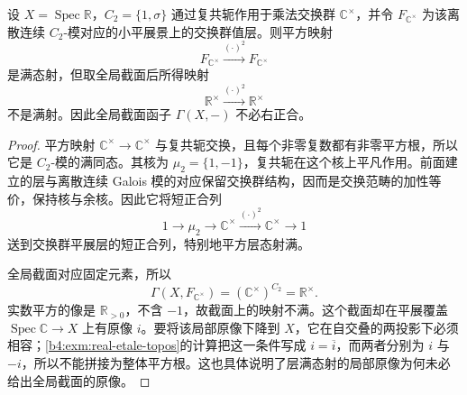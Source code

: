 \begin{proposition}\label{b4:prop:E-global-sections-not-right-exact}
	设 \(X=\operatorname{Spec}\mathbb R\)，\(C_2=\{1,\sigma\}\) 通过复共轭作用于乘法交换群 \(\mathbb C^\times\)，并令 \(F_{\mathbb C^\times}\) 为该离散连续 \(C_2\)-模对应的小平展景上的交换群值层。则平方映射
	\[
		F_{\mathbb C^\times}\xrightarrow{(\cdot)^2}F_{\mathbb C^\times}
	\]
	是满态射，但取全局截面后所得映射
	\[
		\mathbb R^\times\xrightarrow{(\cdot)^2}\mathbb R^\times
	\]
	不是满射。因此全局截面函子 \(\Gamma(X,-)\) 不必右正合。
\end{proposition}
\begin{proof}
	平方映射 \(\mathbb C^\times\to\mathbb C^\times\) 与复共轭交换，且每个非零复数都有非零平方根，所以它是 \(C_2\)-模的满同态。其核为 \(\mu_2=\{1,-1\}\)，复共轭在这个核上平凡作用。前面建立的层与离散连续 Galois 模的对应保留交换群结构，因而是交换范畴的加性等价，保持核与余核。因此它将短正合列
	\[
		1\longrightarrow\mu_2\longrightarrow\mathbb C^\times \xrightarrow{(\cdot)^2}\mathbb C^\times\longrightarrow1
	\]
	送到交换群平展层的短正合列，特别地平方层态射满。

	全局截面对应固定元素，所以
	\[
		\Gamma(X,F_{\mathbb C^\times}) =(\mathbb C^\times)^{C_2}=\mathbb R^\times.
	\]
	实数平方的像是 \(\mathbb R_{>0}\)，不含 \(-1\)，故截面上的映射不满。这个截面却在平展覆盖 \(\operatorname{Spec}\mathbb C\to X\) 上有原像 \(i\)。要将该局部原像下降到 \(X\)，它在自交叠的两投影下必须相容；\cref{b4:exm:real-etale-topos}的计算把这一条件写成 \(i=\overline i\)，而两者分别为 \(i\) 与 \(-i\)，所以不能拼接为整体平方根。这也具体说明了层满态射的局部原像为何未必给出全局截面的原像。
\end{proof}
